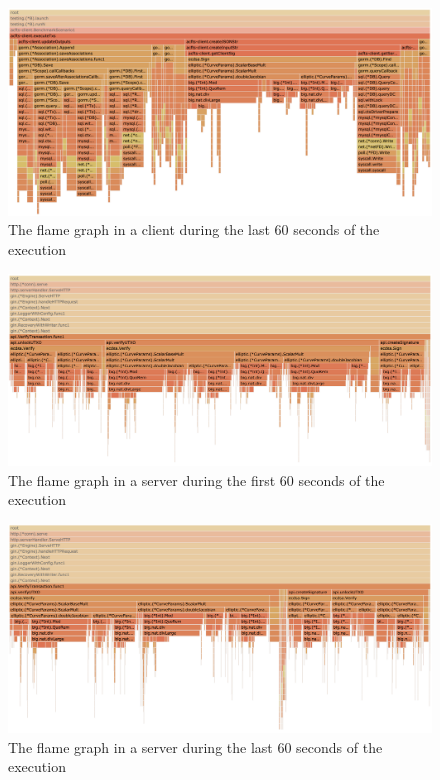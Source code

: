 \documentclass[a4paper, oneside]{discothesis}
\begin{document}
\begin{figure}[p]
    \begin{center}
        \includegraphics[width=\columnwidth]{figures/flame_graph_client_ending}
        \caption{The flame graph in a client during the last 60 seconds of the execution}
        \label{fig:fg-client-e}
    \end{center}
\end{figure}


\begin{figure}[p]
    \begin{center}
        \includegraphics[width=\columnwidth]{figures/flame_graph_server_begining}
        \caption{The flame graph in a server during the first 60 seconds of the execution}
        \label{fig:fg-server-b}
    \end{center}
\end{figure}

\begin{figure}[p]
    \begin{center}
        \includegraphics[width=\columnwidth]{figures/flame_graph_server_ending}
        \caption{The flame graph in a server during the last 60 seconds of the execution}
        \label{fig:fg-server-e}
    \end{center}
\end{figure}
\end{document}
